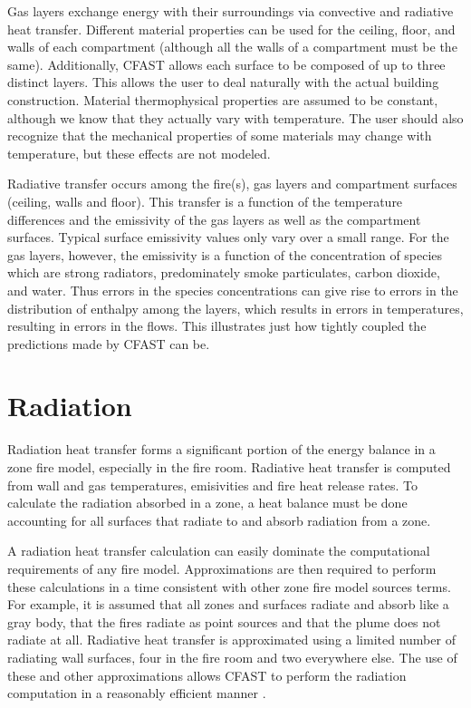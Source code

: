 Gas layers exchange energy with their surroundings via convective and radiative heat transfer.  Different material properties can be used for the ceiling, floor, and walls of each compartment (although all the walls of a compartment must be the same).  Additionally, CFAST allows each surface to be composed of up to three distinct layers.  This allows the user to deal naturally with the actual building construction.  Material thermophysical properties are assumed to be constant, although we know that they actually vary with temperature. The user should also recognize that the mechanical properties of some materials may change with temperature, but these effects are not modeled.						

Radiative transfer occurs among the fire(s), gas layers and compartment surfaces (ceiling, walls and floor).  This transfer is a function of the temperature differences and the emissivity of the gas layers as well as the compartment surfaces.  Typical surface emissivity values only vary over a small range.  For the gas layers, however, the emissivity is a function of the concentration of species which are strong radiators, predominately smoke particulates, carbon dioxide, and water.  Thus errors in the species concentrations can give rise to errors in the distribution of enthalpy among the layers, which results in errors in temperatures, resulting in errors in the flows.  This illustrates just how tightly coupled the predictions made by CFAST can be.

\section{Radiation}
\label{sec:Radiation}

Radiation heat transfer forms a significant portion of the energy balance in a zone fire model, especially in the fire room.  Radiative heat transfer is computed from wall and gas temperatures, emisivities and fire heat release rates.  To calculate the radiation absorbed in a zone, a heat balance must be done accounting for all surfaces that radiate to and absorb radiation from a zone.

A radiation heat transfer calculation can easily dominate the computational requirements of any fire model.  Approximations are then required to perform these calculations in a time consistent with other zone fire model sources terms.  For example, it is assumed that all zones and surfaces radiate and absorb like a gray body, that the fires radiate as point sources and that the plume does not radiate at all.  Radiative heat transfer is approximated using a limited number of radiating wall surfaces, four in the fire room and two everywhere else.  The use of these and other approximations allows CFAST to perform the radiation computation in a reasonably efficient manner \cite{Forney_radiation}.

